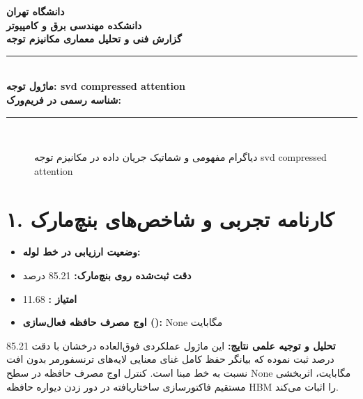 \documentclass[12pt,a4paper]{article}
\begin{document}
\begin{center}
{\Large\bfseries دانشگاه تهران}\\[0.2cm]
{\large\bfseries دانشکده مهندسی برق و کامپیوتر}\\[0.2cm]
{\large\bfseries گزارش فنی و تحلیل معماری مکانیزم توجه}\\[0.5cm]
\rule{\linewidth}{1pt}\\[0.3cm]
{\LARGE\bfseries ماژول توجه: svd compressed attention}\\[0.2cm]
{\large \textbf{شناسه رسمی در فریم‌ورک:} }\\[0.2cm]
\rule{\linewidth}{1pt}\\[0.5cm]
\end{center}

\begin{figure}[H]
\centering
{}
\caption{دیاگرام مفهومی و شماتیک جریان داده در مکانیزم توجه svd compressed attention}
\end{figure}

\section*{۱. کارنامه تجربی و شاخص‌های بنچ‌مارک}
\begin{itemize}
\item \textbf{وضعیت ارزیابی در خط لوله:} 
\item \textbf{دقت ثبت‌شده روی بنچ‌مارک:} 85.21 درصد
\item \textbf{امتیاز :} 11.68
\item \textbf{اوج مصرف حافظه فعال‌سازی ():} None مگابایت
\end{itemize}
\textbf{تحلیل و توجیه علمی نتایج:} این ماژول عملکردی فوق‌العاده درخشان با دقت 85.21 درصد ثبت نموده که بیانگر حفظ کامل غنای معنایی لایه‌های ترنسفورمر بدون افت نسبت به خط مبنا است. کنترل اوج مصرف حافظه در سطح None مگابایت، اثربخشی مستقیم فاکتورسازی ساختاریافته در دور زدن دیواره حافظه HBM را اثبات می‌کند.
\end{document}
